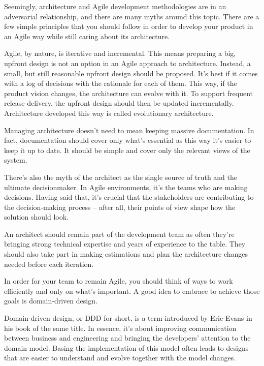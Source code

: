 
Seemingly, architecture and Agile development methodologies are in an adversarial relationship, and there are many myths around this topic. There are a few simple principles that you should follow in order to develop your product in an Agile way while still caring about its architecture.

Agile, by nature, is iterative and incremental. This means preparing a big, upfront design is not an option in an Agile approach to architecture. Instead, a small, but still reasonable upfront design should be proposed. It's best if it comes with a log of decisions with the rationale for each of them. This way, if the product vision changes, the architecture can evolve with it. To support frequent release delivery, the upfront design should then be updated incrementally. Architecture developed this way is called evolutionary architecture.

Managing architecture doesn't need to mean keeping massive documentation. In fact, documentation should cover only what's essential as this way it's easier to keep it up to date. It should be simple and cover only the relevant views of the system.

There's also the myth of the architect as the single source of truth and the ultimate decisionmaker. In Agile environments, it's the teams who are making decisions. Having said that, it's crucial that the stakeholders are contributing to the decision-making process – after all, their points of view shape how the solution should look.

An architect should remain part of the development team as often they're bringing strong technical expertise and years of experience to the table. They should also take part in making estimations and plan the architecture changes needed before each iteration.

In order for your team to remain Agile, you should think of ways to work efficiently and only on what's important. A good idea to embrace to achieve those goals is domain-driven design.



Domain-driven design, or DDD for short, is a term introduced by Eric Evans in his book of the same title. In essence, it's about improving communication between business and engineering and bringing the developers' attention to the domain model. Basing the implementation of this model often leads to designs that are easier to understand and evolve together with the model changes.

